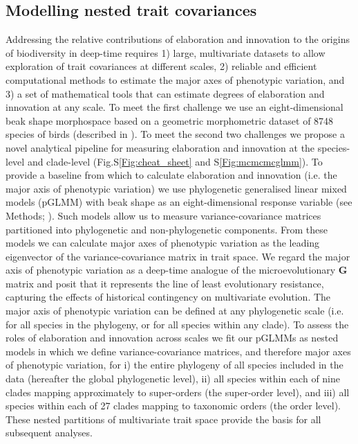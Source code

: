 \documentclass[12pt,letterpaper]{article}
\begin{document}
\subsection{Modelling nested trait covariances}
Addressing the relative contributions of elaboration and innovation to the origins of biodiversity in deep-time requires
1) large, multivariate datasets to allow exploration of trait covariances at different scales,
2) reliable and efficient computational methods to estimate the major axes of phenotypic variation,
and 3) a set of mathematical tools that can estimate degrees of elaboration and innovation at any scale.
To meet the first challenge we use an eight-dimensional beak shape morphospace based on a geometric morphometric dataset of 8748 species of birds (described in \cite{hughes2022global}).
To meet the second two challenges we propose a novel analytical pipeline for measuring elaboration and innovation at the species-level and clade-level (Fig.S\ref{Fig:cheat_sheet} and S\ref{Fig:mcmcmcglmm}).
To provide a baseline from which to calculate elaboration and innovation (i.e. the major axis of phenotypic variation) we use phylogenetic generalised linear mixed models (pGLMM) with beak shape as an eight-dimensional response variable (see Methods; \cite{MCMCglmm}).
Such models allow us to measure variance-covariance matrices partitioned into phylogenetic and non-phylogenetic components.
From these models we can calculate major axes of phenotypic variation as the leading eigenvector of the variance-covariance matrix in trait space.
We regard the major axis of phenotypic variation as a deep-time analogue of the microevolutionary \textbf{G} matrix and posit that it represents the line of least evolutionary resistance, capturing the effects of historical contingency on multivariate evolution.
The major axis of phenotypic variation can be defined at any phylogenetic scale (i.e. for all species in the phylogeny, or for all species within any clade).
To assess the roles of elaboration and innovation across scales we fit our pGLMMs as nested models in which we define variance-covariance matrices, and therefore major axes of phenotypic variation, for
i) the entire phylogeny of all species included in the data (hereafter the global phylogenetic level),
ii) all species within each of nine clades mapping approximately to super-orders (the super-order level),
and iii) all species within each of 27 clades mapping to taxonomic orders (the order level).
These nested partitions of multivariate trait space provide the basis for all subsequent analyses.
\end{document}
